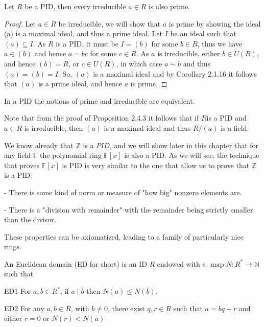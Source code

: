 \begin{proposition}
    Let $R$ be a PID, then every irreducible $a \in R$ is also prime.
\end{proposition} 

\begin{proof}
    Let $a \in R$ be irreducible, we will show that $a$ is prime by showing the ideal (a) is a maximal ideal, and thus a prime ideal. Let $I$ be an ideal such that $(a) \subseteq I$. As $R$ is a PID, it must be $I=(b)$ for some $b \in R$, thus we have $a \in(b)$ and hence $a=b c$ for some $c \in R$. As $a$ is irreducible, either $b \in U(R)$, and hence $(b)=R$, or $c \in U(R)$, in which case $a \sim b$ and thus $(a)=(b)=I$. So, $(a)$ is a maximal ideal and by Corollary 2.1.16 it follows that $(a)$ is a prime ideal, and hence $a$ is prime.
\end{proof} 

 \begin{corollary}
     In a PID the notions of prime and irreducible are equivalent.
 \end{corollary}
 
 Note that from the proof of Proposition 2.4.3 it follows that if $R$is a PID and $a \in R$ is irreducible, then $(a)$ is a maximal ideal and thus $R /(a)$ is a field.

We know already that $\mathbb{Z}$ is a $P I D$, and we will show later in this chapter that for any field $\mathbb{F}$ the polynomial ring $\mathbb{F}[x]$ is also a PID. As we will see, the technique that proves $\mathbb{F}[x]$ is PID is very similar to the one that allow us to prove that $\mathbb{Z}$ is a PID:

- There is some kind of norm or measure of "how big" nonzero elements are.

- There is a "division with remainder" with the remainder being strictly smaller than the divisor.

These properties can be axiomatized, leading to a family of particularly nice rings.

\begin{definition}
    An Euclidean domain (ED for short) is an ID $R$ endowed with a $\operatorname{map} N: R^{*} \rightarrow \mathbb{N}$ such that
    
    ED1 For $a, b \in R^{*}$, if $a \mid b$ then $N(a) \leq N(b)$.

    ED2 For any $a, b \in R$, with $b \neq 0$, there exist $q, r \in R$ such that $a=b q+r$ and either $r=0$ or $N(r)<N(a)$
\end{definition} 

